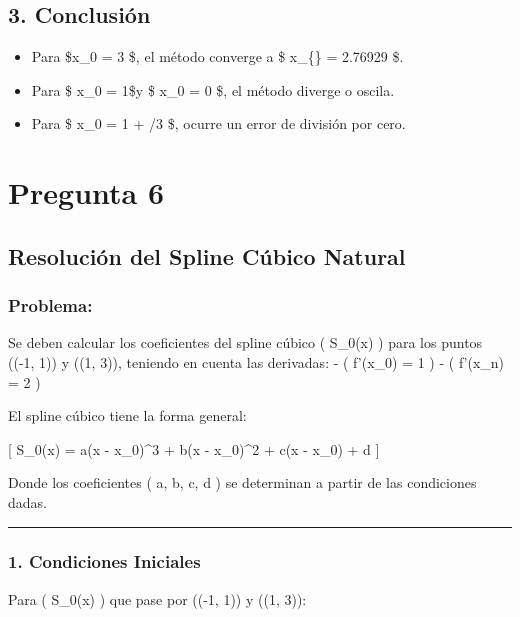 \documentclass[
  letterpaper,
  DIV=11,
  numbers=noendperiod]{scrartcl}
\providecommand{\tightlist}{%
  \setlength{\itemsep}{0pt}\setlength{\parskip}{0pt}}\usepackage{longtable,booktabs,array}
\begin{document}
\subsection{3. Conclusión}\label{conclusiuxf3n}

\begin{itemize}
\tightlist
\item
  Para \$x\_0 = 3 \$, el método converge a \$ x\_\{\} =
  2.76929 \$.
\item
  Para \$ x\_0 = 1\$y \$ x\_0 = 0 \$, el método diverge o oscila.
\item
  Para \$ x\_0 = 1 + /3 \$, ocurre un error de división por
  cero.
\end{itemize}

\section{Pregunta 6}\label{pregunta-6}

\subsection{Resolución del Spline Cúbico
Natural}\label{resoluciuxf3n-del-spline-cuxfabico-natural}

\subsubsection{Problema:}\label{problema}

Se deben calcular los coeficientes del spline cúbico ( S\_0(x) ) para
los puntos ((-1, 1)) y ((1, 3)), teniendo en cuenta las derivadas: - (
f'(x\_0) = 1 ) - ( f'(x\_n) = 2 )

El spline cúbico tiene la forma general:

{[} S\_0(x) = a(x - x\_0)\^{}3 + b(x - x\_0)\^{}2 + c(x - x\_0) + d {]}

Donde los coeficientes ( a, b, c, d ) se determinan a partir de las
condiciones dadas.

\begin{center}\rule{0.5\linewidth}{0.5pt}\end{center}

\subsubsection{1. Condiciones Iniciales}\label{condiciones-iniciales}

Para ( S\_0(x) ) que pase por ((-1, 1)) y ((1, 3)):
\end{document}
